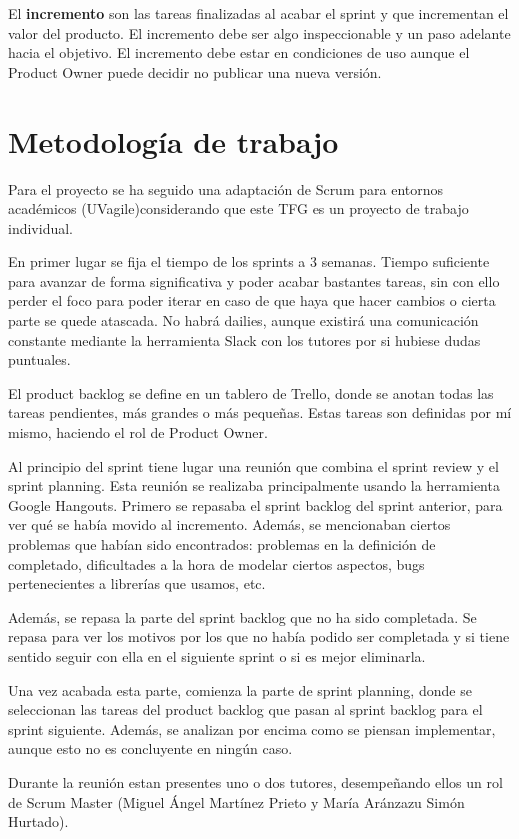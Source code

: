 \documentclass[openright,twoside,12pt]{book}
\begin{document}
El \textbf{incremento} son las tareas finalizadas al acabar el sprint y que incrementan el valor del producto. El incremento debe ser algo inspeccionable y un paso adelante hacia el objetivo. El incremento debe estar en condiciones de uso aunque el Product Owner puede decidir no publicar una nueva versión.

\section{Metodología de trabajo}
Para el proyecto se ha seguido una adaptación de Scrum para entornos académicos (UVagile\cite{uvagile})considerando que este TFG es un proyecto de trabajo individual.

En primer lugar se fija el tiempo de los sprints a 3 semanas. Tiempo suficiente para avanzar de forma significativa y poder acabar bastantes tareas, sin con ello perder el foco para poder iterar en caso de que haya que hacer cambios o cierta parte se quede atascada. No habrá dailies, aunque existirá una comunicación constante mediante la herramienta Slack con los tutores por si hubiese dudas puntuales.

El product backlog se define en un tablero de Trello, donde se anotan todas las tareas pendientes, más grandes o más pequeñas. Estas tareas son definidas por mí mismo, haciendo el rol de Product Owner.

Al principio del sprint tiene lugar una reunión que combina el sprint review y el sprint planning. Esta reunión se realizaba principalmente usando la herramienta Google Hangouts. Primero se repasaba el sprint backlog del sprint anterior, para ver qué se había movido al incremento. Además, se mencionaban ciertos problemas que habían sido encontrados: problemas en la definición de completado, dificultades a la hora de modelar ciertos aspectos, bugs pertenecientes a librerías que usamos, etc.

Además, se repasa la parte del sprint backlog que no ha sido completada. Se repasa para ver los motivos por los que no había podido ser completada y si tiene sentido seguir con ella en el siguiente sprint o si es mejor eliminarla.

Una vez acabada esta parte, comienza la parte de sprint planning, donde se seleccionan las tareas del product backlog que pasan al sprint backlog para el sprint siguiente. Además, se analizan por encima como se piensan implementar, aunque esto no es concluyente en ningún caso.

Durante la reunión estan presentes uno o dos tutores, desempeñando ellos un rol de Scrum Master (Miguel Ángel Martínez Prieto y María Aránzazu Simón Hurtado).
\end{document}
